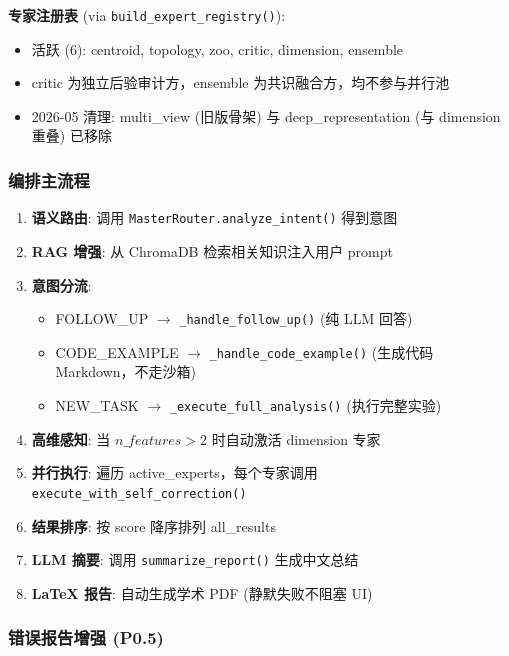 \documentclass[12pt,a4paper]{article}
\begin{document}
\textbf{专家注册表} (via \texttt{build\_expert\_registry()}):
\begin{itemize}[nosep]
    \item 活跃 (6): centroid, topology, zoo, critic, dimension, ensemble
    \item critic 为独立后验审计方，ensemble 为共识融合方，均不参与并行池
    \item 2026-05 清理: multi\_view (旧版骨架) 与 deep\_representation (与 dimension 重叠) 已移除
\end{itemize}

\subsubsection{编排主流程}

\begin{enumerate}[nosep]
    \item \textbf{语义路由}: 调用 \texttt{MasterRouter.analyze\_intent()} 得到意图
    \item \textbf{RAG 增强}: 从 ChromaDB 检索相关知识注入用户 prompt
    \item \textbf{意图分流}:
    \begin{itemize}[nosep]
        \item FOLLOW\_UP $\rightarrow$ \texttt{\_handle\_follow\_up()} (纯 LLM 回答)
        \item CODE\_EXAMPLE $\rightarrow$ \texttt{\_handle\_code\_example()} (生成代码 Markdown，不走沙箱)
        \item NEW\_TASK $\rightarrow$ \texttt{\_execute\_full\_analysis()} (执行完整实验)
    \end{itemize}
    \item \textbf{高维感知}: 当 $n\_features > 2$ 时自动激活 dimension 专家
    \item \textbf{并行执行}: 遍历 active\_experts，每个专家调用 \texttt{execute\_with\_self\_correction()}
    \item \textbf{结果排序}: 按 score 降序排列 all\_results
    \item \textbf{LLM 摘要}: 调用 \texttt{summarize\_report()} 生成中文总结
    \item \textbf{LaTeX 报告}: 自动生成学术 PDF (静默失败不阻塞 UI)
\end{enumerate}

\subsubsection{错误报告增强 (P0.5)}
\end{document}
